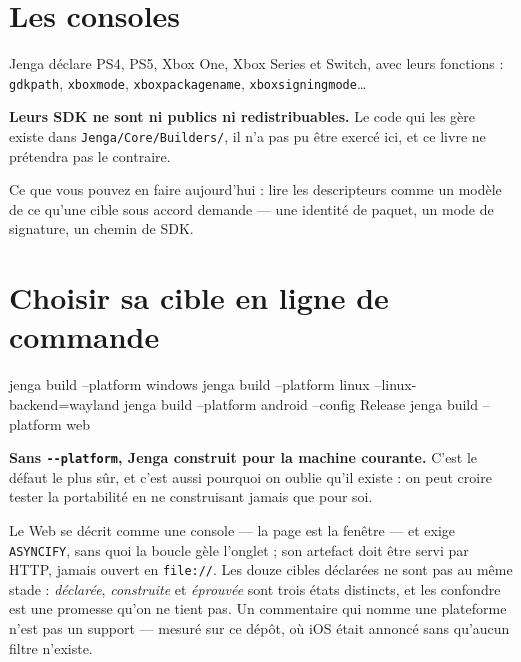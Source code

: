 \section{Les consoles}

\begin{nkretenir}
Jenga déclare PS4, PS5, Xbox One, Xbox Series et Switch, avec leurs fonctions :
\texttt{gdkpath}, \texttt{xboxmode}, \texttt{xboxpackagename},
\texttt{xboxsigningmode}\dots

\textbf{Leurs SDK ne sont ni publics ni redistribuables.} Le code qui les gère
existe dans \texttt{Jenga/Core/Builders/}, il n'a pas pu être exercé ici, et ce
livre ne prétendra pas le contraire.

Ce que vous pouvez en faire aujourd'hui : lire les descripteurs comme un modèle
de ce qu'une cible sous accord demande --- une identité de paquet, un mode de
signature, un chemin de SDK.
\end{nkretenir}

\section{Choisir sa cible en ligne de commande}

\begin{nkcode}{}
jenga build --platform windows
jenga build --platform linux --linux-backend=wayland
jenga build --platform android --config Release
jenga build --platform web
\end{nkcode}

\begin{nkretenir}
\textbf{Sans \texttt{-{}-platform}, Jenga construit pour la machine courante.}
C'est le défaut le plus sûr, et c'est aussi pourquoi on oublie qu'il existe : on
peut croire tester la portabilité en ne construisant jamais que pour soi.
\end{nkretenir}

\begin{nkbilan}
Le Web se décrit comme une console --- la page est la fenêtre --- et exige
\texttt{ASYNCIFY}, sans quoi la boucle gèle l'onglet ; son artefact doit être
servi par HTTP, jamais ouvert en \texttt{file://}. Les douze cibles déclarées ne
sont pas au même stade : \emph{déclarée}, \emph{construite} et \emph{éprouvée}
sont trois états distincts, et les confondre est une promesse qu'on ne tient pas.
Un commentaire qui nomme une plateforme n'est pas un support --- mesuré sur ce
dépôt, où iOS était annoncé sans qu'aucun filtre n'existe.
\end{nkbilan}

